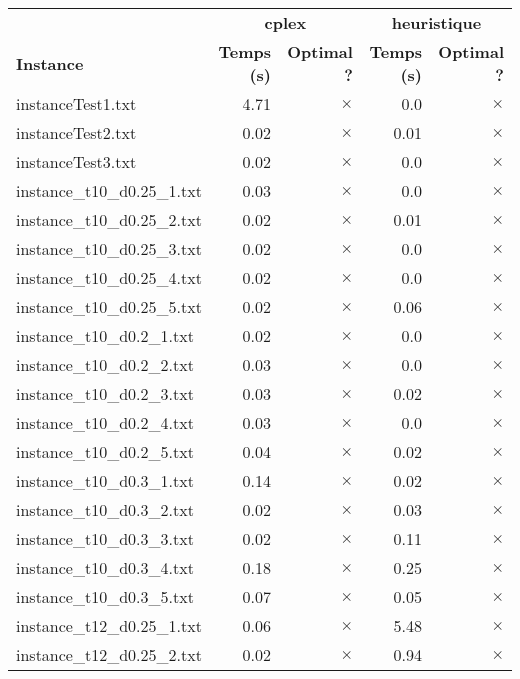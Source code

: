 \documentclass{article}
\begin{document}
\begin{center}
\renewcommand{\arraystretch}{1.4} 
 \begin{tabular}{lrrrr}
	\hline
 & \multicolumn{2}{c}{\textbf{cplex}} & \multicolumn{2}{c}{\textbf{heuristique}}\\
\textbf{Instance}  & \textbf{Temps (s)} & \textbf{Optimal ?}  & \textbf{Temps (s)} & \textbf{Optimal ?} \\\hline

instanceTest1.txt & 4.71 & 
$\times$
 & 0.0 & 
$\times$
\\
instanceTest2.txt & 0.02 & 
$\times$
 & 0.01 & 
$\times$
\\
instanceTest3.txt & 0.02 & 
$\times$
 & 0.0 & 
$\times$
\\
instance\_t10\_d0.25\_1.txt & 0.03 & 
$\times$
 & 0.0 & 
$\times$
\\
instance\_t10\_d0.25\_2.txt & 0.02 & 
$\times$
 & 0.01 & 
$\times$
\\
instance\_t10\_d0.25\_3.txt & 0.02 & 
$\times$
 & 0.0 & 
$\times$
\\
instance\_t10\_d0.25\_4.txt & 0.02 & 
$\times$
 & 0.0 & 
$\times$
\\
instance\_t10\_d0.25\_5.txt & 0.02 & 
$\times$
 & 0.06 & 
$\times$
\\
instance\_t10\_d0.2\_1.txt & 0.02 & 
$\times$
 & 0.0 & 
$\times$
\\
instance\_t10\_d0.2\_2.txt & 0.03 & 
$\times$
 & 0.0 & 
$\times$
\\
instance\_t10\_d0.2\_3.txt & 0.03 & 
$\times$
 & 0.02 & 
$\times$
\\
instance\_t10\_d0.2\_4.txt & 0.03 & 
$\times$
 & 0.0 & 
$\times$
\\
instance\_t10\_d0.2\_5.txt & 0.04 & 
$\times$
 & 0.02 & 
$\times$
\\
instance\_t10\_d0.3\_1.txt & 0.14 & 
$\times$
 & 0.02 & 
$\times$
\\
instance\_t10\_d0.3\_2.txt & 0.02 & 
$\times$
 & 0.03 & 
$\times$
\\
instance\_t10\_d0.3\_3.txt & 0.02 & 
$\times$
 & 0.11 & 
$\times$
\\
instance\_t10\_d0.3\_4.txt & 0.18 & 
$\times$
 & 0.25 & 
$\times$
\\
instance\_t10\_d0.3\_5.txt & 0.07 & 
$\times$
 & 0.05 & 
$\times$
\\
instance\_t12\_d0.25\_1.txt & 0.06 & 
$\times$
 & 5.48 & 
$\times$
\\
instance\_t12\_d0.25\_2.txt & 0.02 & 
$\times$
 & 0.94 & 
$\times$
\\

\end{tabular}
\end{center}
\end{document}
